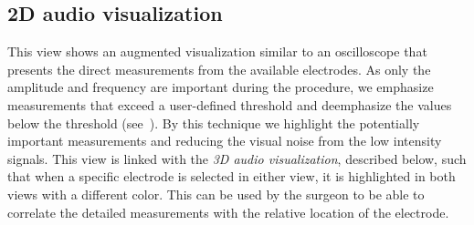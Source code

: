 \subsection{2D audio visualization} \label{contributions:dbs:audio2d}
This view shows an augmented visualization similar to an oscilloscope that presents the direct measurements from the available electrodes. As only the amplitude and frequency are important during the procedure, we emphasize measurements that exceed a user-defined threshold and deemphasize the values below the threshold (see~). By this technique we highlight the potentially important measurements and reducing the visual noise from the low intensity signals. This view is linked with the \emph{3D audio visualization}, described below, such that when a specific electrode is selected in either view, it is highlighted in both views with a different color. This can be used by the surgeon to be able to correlate the detailed measurements with the relative location of the electrode.
